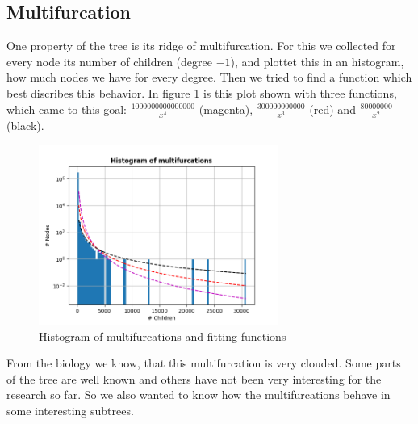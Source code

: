     \subsection{Multifurcation}
      One property of the tree is its ridge of multifurcation. For this we collected for every node its
        number of children (degree $-1$), and plottet this in an histogram, how much nodes we have for 
        every degree. Then we tried to find a function which best discribes this behavior. In figure 
        \ref{fig:HistogramsOfMultifurcations} is this plot shown with three functions, which came 
         to this goal: $\frac{1000000000000000}{x^4}$ (magenta), 
        $\frac{300000000000}{x^3}$ (red) and $\frac{80000000}{x^2}$ (black). \\
      \begin{figure}[h]
        \caption{Histogram of multifurcations and fitting functions}
        \centering
        \label{fig:HistogramsOfMultifurcations}
        \includegraphics[width=0.7\textwidth]{Figures/HistogramsOfMultifurcations.png}
      \end{figure}
      From the biology we know, that this multifurcation is very clouded. Some parts of the tree are 
        well known and others have not been very interesting for the research so far. So we also wanted 
        to know how the multifurcations behave in some interesting subtrees. \\
       \\
       \\

